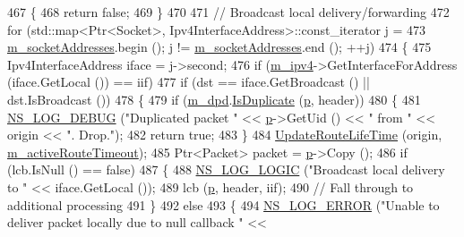\begin{DoxyCode}
467     \{
468       \textcolor{keywordflow}{return} \textcolor{keyword}{false}; 
469     \}
470 
471   \textcolor{comment}{// Broadcast local delivery/forwarding}
472   \textcolor{keywordflow}{for} (std::map<Ptr<Socket>, Ipv4InterfaceAddress>::const\_iterator j =
473          \hyperlink{classns3_1_1aodv_1_1RoutingProtocol_aa3263563cbbd735faafbf17fd4e28a10}{m\_socketAddresses}.begin (); j != \hyperlink{classns3_1_1aodv_1_1RoutingProtocol_aa3263563cbbd735faafbf17fd4e28a10}{m\_socketAddresses}.end (); ++j)
474     \{
475       Ipv4InterfaceAddress iface = j->second;
476       \textcolor{keywordflow}{if} (\hyperlink{classns3_1_1aodv_1_1RoutingProtocol_aee33006b1f9d8b24d4722037ff3fec98}{m\_ipv4}->GetInterfaceForAddress (iface.GetLocal ()) == iif)
477         \textcolor{keywordflow}{if} (dst == iface.GetBroadcast () || dst.IsBroadcast ())
478           \{
479             \textcolor{keywordflow}{if} (\hyperlink{classns3_1_1aodv_1_1RoutingProtocol_a43361f0a08b0c538415910cd904d0af9}{m\_dpd}.\hyperlink{classns3_1_1aodv_1_1DuplicatePacketDetection_a997ef453692de951dad7485215985a6b}{IsDuplicate} (\hyperlink{lte__link__budget_8m_ac9de518908a968428863f829398a4e62}{p}, header))
480               \{
481                 \hyperlink{group__logging_ga413f1886406d49f59a6a0a89b77b4d0a}{NS\_LOG\_DEBUG} (\textcolor{stringliteral}{"Duplicated packet "} << \hyperlink{lte__link__budget_8m_ac9de518908a968428863f829398a4e62}{p}->GetUid () << \textcolor{stringliteral}{" from "} << origin << \textcolor{stringliteral}{".
       Drop."});
482                 \textcolor{keywordflow}{return} \textcolor{keyword}{true};
483               \}
484             \hyperlink{classns3_1_1aodv_1_1RoutingProtocol_a204c68e4ce5aa8dc799f9fd039f8cbc7}{UpdateRouteLifeTime} (origin, \hyperlink{classns3_1_1aodv_1_1RoutingProtocol_a37ec921ef1c48e4d8e7072fe989613d2}{m\_activeRouteTimeout});
485             Ptr<Packet> packet = \hyperlink{lte__link__budget_8m_ac9de518908a968428863f829398a4e62}{p}->Copy ();
486             \textcolor{keywordflow}{if} (lcb.IsNull () == \textcolor{keyword}{false})
487               \{
488                 \hyperlink{group__logging_ga88acd260151caf2db9c0fc84997f45ce}{NS\_LOG\_LOGIC} (\textcolor{stringliteral}{"Broadcast local delivery to "} << iface.GetLocal ());
489                 lcb (\hyperlink{lte__link__budget_8m_ac9de518908a968428863f829398a4e62}{p}, header, iif);
490                 \textcolor{comment}{// Fall through to additional processing}
491               \}
492             \textcolor{keywordflow}{else}
493               \{
494                 \hyperlink{group__logging_ga0261a8db1d4ac5f79417d117634fd455}{NS\_LOG\_ERROR} (\textcolor{stringliteral}{"Unable to deliver packet locally due to null callback "} << 

\end{DoxyCode}
